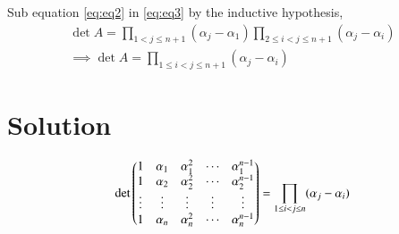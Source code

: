 \documentclass[journal,12pt,twocolumn]{IEEEtran}
\begin{document}
Sub equation \eqref{eq:eq2} in \eqref{eq:eq3} by the inductive hypothesis,
\begin{align}
    \det{A} = \prod_{1< j\leq n+1} (\alpha_{j}-\alpha_{1}) \prod_{2\leq i<j\leq n+1} (\alpha_{j}-\alpha_{i})\\
\implies \det{A} = \prod_{1\leq i<j\leq n+1} (\alpha_{j}-\alpha_{i})
\end{align}
\section{Solution}
\begin{align*}
    \det{\ensuremath{\begin{pmatrix}1&\alpha_1&\alpha_1^2&\cdots&\alpha_1^{n-1}\\1&\alpha_2&\alpha_2^2&\cdots&\alpha_2^{n-1}\\\vdots&\vdots&\vdots&\vdots&\vdots\\1&\alpha_n&\alpha_n^2&\cdots&\alpha_n^{n-1}\end{pmatrix}}} = \prod_{1\leq i<j\leq n} (\alpha_{j}-\alpha_{i})
\end{align*}
\\
\end{document}
